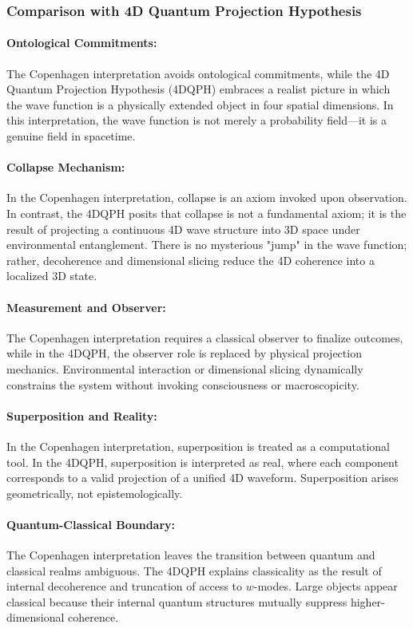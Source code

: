 \documentclass[12pt]{article}
\begin{document}
\subsubsection*{Comparison with 4D Quantum Projection Hypothesis}

\paragraph{Ontological Commitments:}
The Copenhagen interpretation avoids ontological commitments, while the 4D Quantum Projection Hypothesis (4DQPH) embraces a realist picture in which the wave function is a physically extended object in four spatial dimensions. In this interpretation, the wave function is not merely a probability field—it is a genuine field in spacetime.

\paragraph{Collapse Mechanism:}
In the Copenhagen interpretation, collapse is an axiom invoked upon observation. In contrast, the 4DQPH posits that collapse is not a fundamental axiom; it is the result of projecting a continuous 4D wave structure into 3D space under environmental entanglement. There is no mysterious "jump" in the wave function; rather, decoherence and dimensional slicing reduce the 4D coherence into a localized 3D state.

\paragraph{Measurement and Observer:}
The Copenhagen interpretation requires a classical observer to finalize outcomes, while in the 4DQPH, the observer role is replaced by physical projection mechanics. Environmental interaction or dimensional slicing dynamically constrains the system without invoking consciousness or macroscopicity.

\paragraph{Superposition and Reality:}
In the Copenhagen interpretation, superposition is treated as a computational tool. In the 4DQPH, superposition is interpreted as real, where each component corresponds to a valid projection of a unified 4D waveform. Superposition arises geometrically, not epistemologically.

\paragraph{Quantum-Classical Boundary:}
The Copenhagen interpretation leaves the transition between quantum and classical realms ambiguous. The 4DQPH explains classicality as the result of internal decoherence and truncation of access to \( w \)-modes. Large objects appear classical because their internal quantum structures mutually suppress higher-dimensional coherence.
\end{document}
